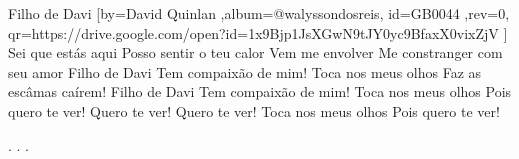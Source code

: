 \beginsong
{Filho de Davi %
}[by={David Quinlan %
},album={@walyssondosreis},
id={GB0044 %
},rev={0}, %
qr={https://drive.google.com/open?id=1x9Bjp1JsXGwN9tJY0yc9BfaxX0vixZjV %
}]
\beginverse*
Sei que estás aqui
Posso sentir o teu calor
Vem me envolver
Me constranger com seu amor
\endverse
\beginverse*
Filho de Davi
Tem compaixão de mim!
Toca nos meus olhos
Faz as escâmas caírem!
Filho de Davi
Tem compaixão de mim!
Toca nos meus olhos
Pois quero te ver!
\endverse
\beginchorus
Quero te ver!
Quero te ver!
Toca nos meus olhos
Pois quero te ver!
\endchorus


\beginverse*\color{white}
.
.
.
\endverse
\begin{comment}
\lstset{basicstyle=\scriptsize\bf} %
\tab{Solo 1}
\begin{lstlisting}
E|-----------------------------------------------------|
B|-----------------------------------------------------|
G|-----------------------------------------------------|
D|-----------------------------------------------------|
A|-----------------------------------------------------|
E|-----------------------------------------------------|
\end{lstlisting}
\end{comment}
 
